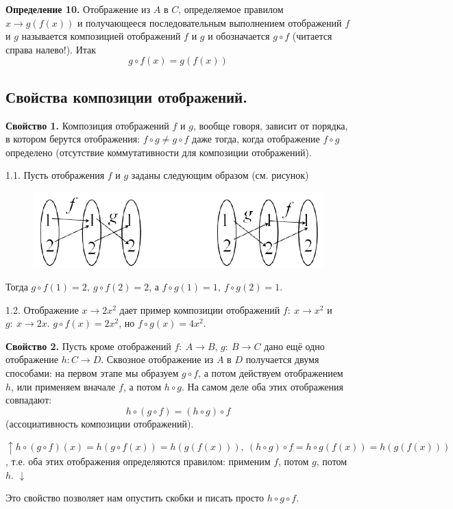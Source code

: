 \documentclass{article}
\begin{document}
    \textbf{Определение 10.} Отображение из $A$ в $C$, определяемое правилом $x \rightarrow g(f(x))$ и получающееся последовательным выполнением отображений $f$ и $g$ называется композицией отображений $f$ и $g$ и обозначается $g \circ f$ (читается справа налево!). Итак
    \[g \circ f(x) = g(f(x))\]

    \subsection{Свойства композиции отображений.}
    
    \textbf{Свойство 1.} Композиция отображений $f$ и $g$, вообще говоря, зависит от порядка, в котором берутся отображения: $f \circ g \neq g \circ f$ даже тогда, когда отображение $f \circ g$ определено (отсутствие коммутативности для композиции отображений).

    1.1. Пусть отображения $f$ и $g$ заданы следующим образом (см. рисунок)

    \begin{figure}[h!]
    \centering
    \includegraphics[scale=0.5]{2_3}
    \end{figure}

    Тогда $g \circ f(1) = 2,\ g \circ f(2) = 2$, а $f \circ g(1) = 1,\ f \circ g(2) = 1$.

    1.2. Отображение $x \rightarrow 2x^2$ дает пример композиции отображений $f:\ x \rightarrow x^2$ и $g:\ x \rightarrow 2x$. $g \circ f(x) = 2x^2$, но $f \circ g(x) = 4x^2$.

    \textbf{Свойство 2.} Пусть кроме отображений $f:\ A \rightarrow B$, $g:\ B \rightarrow C$ дано ещё одно отображение $h: C \rightarrow D$. Сквозное отображение из $A$ в $D$ получается двумя способами: на первом этапе мы образуем $g \circ f$, а потом действуем отображением $h$, или применяем вначале $f$, а потом $h \circ g$. На самом деле оба этих отображения совпадают:
    \[h \circ (g \circ f) = (h \circ g) \circ f\]
    (ассоциативность композиции отображений).

    $\uparrow h \circ (g \circ f)(x) = h(g \circ f(x)) = h(g(f(x))),\ (h \circ g) \circ f = h \circ g(f(x)) = h(g(f(x)))$, т.е. оба этих отображения определяются правилом: применим $f$, потом $g$, потом $h$. $\downarrow$

    Это свойство позволяет нам опустить скобки и писать просто $h \circ g \circ f$.

\end{document}
